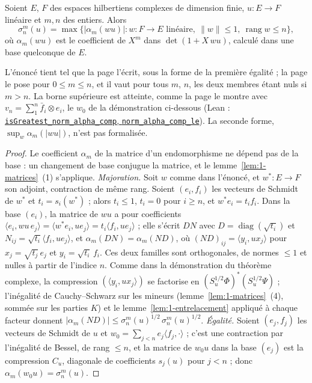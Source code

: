 \begin{encadre}
\begin{theoreme}
Soient $E$, $F$ des espaces hilbertiens complexes de dimension finie, $u : E \to F$ linéaire et $m, n$ des entiers. Alors
\[
  \sigma_n^m(u) = \max\bigl\{ |\alpha_m(w u)| : w : F \to E \text{ linéaire},\ \|w\| \leq 1,\ \operatorname{rang} w \leq n \bigr\},
\]
où $\alpha_m(wu)$ est le coefficient de $X^m$ dans $\det(1 + X\,wu)$, calculé dans une base quelconque de $E$.
\end{theoreme}
\end{encadre}
L'énoncé tient tel que la page l'écrit, sous la forme de la première égalité ; la page le pose pour $0 \leq m \leq n$, et il vaut pour tous $m$, $n$, les deux membres étant nuls si $m > n$. La borne supérieure est atteinte, comme la page le montre avec $v_n = \sum_1^n \bar f_i \otimes e_i$, le $w_0$ de la démonstration ci-dessous (Lean : \href{\leanblob/LinearAlgebra/Folder1.lean}{\texttt{isGreatest\_norm\_alpha\_comp}, \texttt{norm\_alpha\_comp\_le}}). La seconde forme, $\sup_w \alpha_m(|wu|)$, n'est pas formalisée.
\begin{proof}
Le coefficient $\alpha_m$ de la matrice d'un endomorphisme ne dépend pas de la base : un changement de base conjugue la matrice, et le lemme~\ref{lem:1-matrices}~(1) s'applique. \emph{Majoration.} Soit $w$ comme dans l'énoncé, et $w^* : E \to F$ son adjoint, contraction de même rang. Soient $(e_i, f_i)$ les vecteurs de Schmidt de $w^*$ et $t_i = s_i(w^*)$ ; alors $t_i \leq 1$, $t_i = 0$ pour $i \geq n$, et $w^* e_i = t_i f_i$. Dans la base $(e_i)$, la matrice de $wu$ a pour coefficients $\langle e_i, wu\,e_j\rangle = \langle w^* e_i, u e_j\rangle = t_i \langle f_i, u e_j\rangle$ ; elle s'écrit $DN$ avec $D = \operatorname{diag}(\sqrt{t_i})$ et $N_{ij} = \sqrt{t_i}\langle f_i, u e_j\rangle$, et $\alpha_m(DN) = \alpha_m(ND)$, où $(ND)_{ij} = \langle y_i, u x_j\rangle$ pour $x_j = \sqrt{t_j}\, e_j$ et $y_i = \sqrt{t_i}\, f_i$. Ces deux familles sont orthogonales, de normes $\leq 1$ et nulles à partir de l'indice $n$. Comme dans la démonstration du théorème complexe, la compression $(\langle y_i, u x_j\rangle)$ se factorise en $(S_u^{1/2}\Phi)^*(S_u^{1/2}\Psi)$ ; l'inégalité de Cauchy--Schwarz sur les mineurs (lemme~\ref{lem:1-matrices}~(4), sommée sur les parties $K$) et le lemme~\ref{lem:1-entrelacement} appliqué à chaque facteur donnent $|\alpha_m(ND)| \leq \sigma_n^m(u)^{1/2}\,\sigma_n^m(u)^{1/2}$. \emph{Égalité.} Soient $(e_j, f_j)$ les vecteurs de Schmidt de $u$ et $w_0 = \sum_{j<n} e_j \langle f_j, \cdot\rangle$ ; c'est une contraction par l'inégalité de Bessel, de rang $\leq n$, et la matrice de $w_0 u$ dans la base $(e_j)$ est la compression $C_u$, diagonale de coefficients $s_j(u)$ pour $j < n$ ; donc $\alpha_m(w_0 u) = \sigma_n^m(u)$.
\end{proof}

